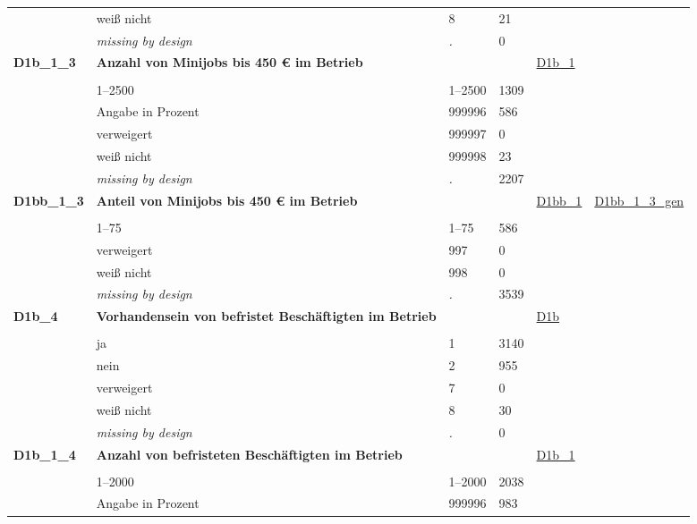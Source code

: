 \begin{longtable}{| L{2.45cm} | L{6cm} | C{1.5cm} | R{1cm} | C{2.25cm} | C{2.25cm} |}
   & weiß nicht & 8 & 21 &  &  \\ 
   & \textit{missing by design} & \textit{.} & 0 &  &  \\ 
   \midrule
\textbf{D1b\_1\_3}\label{var:D1b:1:3} & \textbf{Anzahl von Minijobs bis 450 € im Betrieb} &  &  & \hyperref[D1b:1]{D1b\_1} & \hyperref[var:suf:]{} \\ 
   &  &  &  &  &  \\ 
   & 1--2500 & 1--2500 & 1309 &  &  \\ 
   & Angabe in Prozent & 999996 & 586 &  &  \\ 
   & verweigert & 999997 & 0 &  &  \\ 
   & weiß nicht & 999998 & 23 &  &  \\ 
   & \textit{missing by design} & \textit{.} & 2207 &  &  \\ 
   \midrule
\textbf{D1bb\_1\_3}\label{var:D1bb:1:3} & \textbf{Anteil von Minijobs bis 450 € im Betrieb} &  &  & \hyperref[D1bb:1]{D1bb\_1} & \hyperref[var:suf:D1bb:1:3:gen]{D1bb\_1\_3\_gen} \\ 
   &  &  &  &  &  \\ 
   & 1--75 & 1--75 & 586 &  &  \\ 
   & verweigert & 997 & 0 &  &  \\ 
   & weiß nicht & 998 & 0 &  &  \\ 
   & \textit{missing by design} & \textit{.} & 3539 &  &  \\ 
   \midrule
\textbf{D1b\_4}\label{var:D1b:4} & \textbf{Vorhandensein von befristet Beschäftigten im Betrieb} &  &  & \hyperref[D1b]{D1b} & \hyperref[var:suf:]{} \\ 
   &  &  &  &  &  \\ 
   & ja & 1 & 3140 &  &  \\ 
   & nein & 2 & 955 &  &  \\ 
   & verweigert & 7 & 0 &  &  \\ 
   & weiß nicht & 8 & 30 &  &  \\ 
   & \textit{missing by design} & \textit{.} & 0 &  &  \\ 
   \midrule
\textbf{D1b\_1\_4}\label{var:D1b:1:4} & \textbf{Anzahl von befristeten Beschäftigten im Betrieb} &  &  & \hyperref[D1b:1]{D1b\_1} & \hyperref[var:suf:]{} \\ 
   &  &  &  &  &  \\ 
   & 1--2000 & 1--2000 & 2038 &  &  \\ 
   & Angabe in Prozent & 999996 & 983 &  &  \\ 

\end{longtable}
